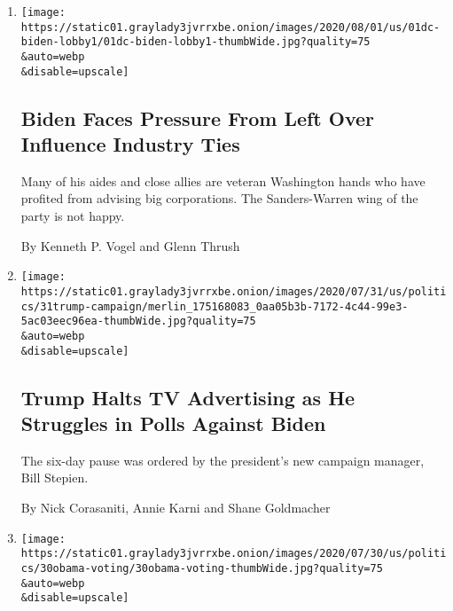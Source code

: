 \begin{enumerate}
\def\labelenumi{\arabic{enumi}.}
\item
  \href{/2020/08/01/us/politics/biden-lobbyist-ties.html}{}

  \texttt{[image: https://static01.graylady3jvrrxbe.onion/images/2020/08/01/us/01dc-biden-lobby1/01dc-biden-lobby1-thumbWide.jpg?quality=75\\\&auto=webp\\\&disable=upscale]}

  \hypertarget{biden-faces-pressure-from-left-over-influence-industry-ties}{%
  \subsection{Biden Faces Pressure From Left Over Influence Industry
  Ties}\label{biden-faces-pressure-from-left-over-influence-industry-ties}}

  Many of his aides and close allies are veteran Washington hands who
  have profited from advising big corporations. The Sanders-Warren wing
  of the party is not happy.

  By Kenneth P. Vogel and Glenn Thrush
\item
  \href{/2020/07/31/us/politics/trump-campaign-tv-advertising.html}{}

  \texttt{[image: https://static01.graylady3jvrrxbe.onion/images/2020/07/31/us/politics/31trump-campaign/merlin\_175168083\_0aa05b3b-7172-4c44-99e3-5ac03eec96ea-thumbWide.jpg?quality=75\\\&auto=webp\\\&disable=upscale]}

  \hypertarget{trump-halts-tv-advertising-as-he-struggles-in-polls-against-biden}{%
  \subsection{Trump Halts TV Advertising as He Struggles in Polls
  Against
  Biden}\label{trump-halts-tv-advertising-as-he-struggles-in-polls-against-biden}}

  The six-day pause was ordered by the president's new campaign manager,
  Bill Stepien.

  By Nick Corasaniti, Annie Karni and Shane Goldmacher
\item
  \href{/2020/07/30/us/politics/john-lewis-funeral-barack-obama.html}{}

  \texttt{[image: https://static01.graylady3jvrrxbe.onion/images/2020/07/30/us/politics/30obama-voting/30obama-voting-thumbWide.jpg?quality=75\\\&auto=webp\\\&disable=upscale]}

  \hypertarget{at-lewis-funeral-obama-calls-filibuster-a-jim-crow-relic}{%
}
\end{enumerate}
